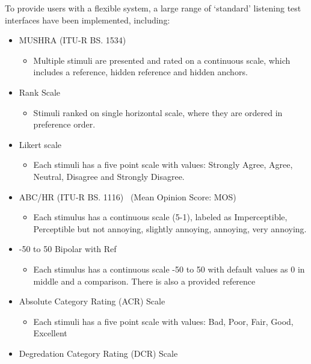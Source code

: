 \documentclass{sig-alternate}
\begin{document}
To provide users with a flexible system, a large range of `standard' listening test interfaces have been implemented, including: %
	\begin{itemize}[noitemsep,nolistsep]
		\item MUSHRA (ITU-R BS. 1534)~\cite{recommendation20031534}
		\begin{itemize}
			\item Multiple stimuli are presented and rated on a continuous scale, which includes a reference, hidden reference and hidden anchors.
		\end{itemize}
		\item Rank Scale~\cite{pascoe1983evaluation}
		\begin{itemize}
			\item Stimuli ranked on single horizontal scale, where they are ordered in preference order.
		\end{itemize}
		\item Likert scale~\cite{likert1932technique}
		\begin{itemize}
			\item Each stimuli has a five point scale with values: Strongly Agree, Agree, Neutral, Disagree and Strongly Disagree.
		\end{itemize}
		\item ABC/HR (ITU-R BS. 1116)~\cite{recommendation19971116} (Mean Opinion Score: MOS)
		\begin{itemize}
			\item Each stimulus has a continuous scale (5-1), labeled as Imperceptible, Perceptible but not annoying, slightly annoying, annoying, very annoying.
		\end{itemize}
		\item -50 to 50 Bipolar with Ref
		\begin{itemize}
			\item Each stimulus has a continuous scale -50 to 50 with default values as 0 in middle and a comparison. There is also a provided reference		\end{itemize}
		\item Absolute Category Rating (ACR) Scale~\cite{rec1996p}
		\begin{itemize}
			\item Each stimuli has a five point scale with values: Bad, Poor, Fair, Good, Excellent
		\end{itemize}
		\item Degredation Category Rating (DCR) Scale~\cite{rec1996p}

\end{itemize}
\end{document}
